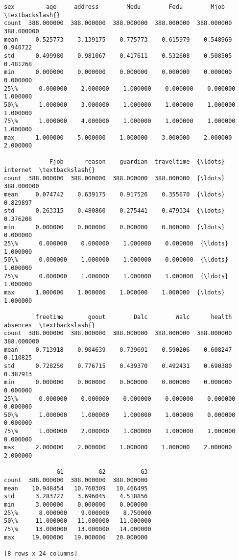             \begin{tcolorbox}[breakable, size=fbox, boxrule=.5pt, pad at break*=1mm, opacityfill=0]
\begin{Verbatim}[commandchars=\\\{\}]
              sex         age     address        Medu        Fedu        Mjob  \textbackslash{}
count  388.000000  388.000000  388.000000  388.000000  388.000000  388.000000
mean     0.525773    3.139175    0.775773    0.615979    0.548969    0.940722
std      0.499980    0.981067    0.417611    0.532608    0.508505    0.481268
min      0.000000    0.000000    0.000000    0.000000    0.000000    0.000000
25\%      0.000000    2.000000    1.000000    0.000000    0.000000    1.000000
50\%      1.000000    3.000000    1.000000    1.000000    1.000000    1.000000
75\%      1.000000    4.000000    1.000000    1.000000    1.000000    1.000000
max      1.000000    5.000000    1.000000    3.000000    2.000000    2.000000

             Fjob      reason    guardian  traveltime  {\ldots}    internet  \textbackslash{}
count  388.000000  388.000000  388.000000  388.000000  {\ldots}  388.000000
mean     0.074742    0.639175    0.917526    0.355670  {\ldots}    0.829897
std      0.263315    0.480860    0.275441    0.479334  {\ldots}    0.376208
min      0.000000    0.000000    0.000000    0.000000  {\ldots}    0.000000
25\%      0.000000    0.000000    1.000000    0.000000  {\ldots}    1.000000
50\%      0.000000    1.000000    1.000000    0.000000  {\ldots}    1.000000
75\%      0.000000    1.000000    1.000000    1.000000  {\ldots}    1.000000
max      1.000000    1.000000    1.000000    1.000000  {\ldots}    1.000000

         freetime       goout        Dalc        Walc      health    absences  \textbackslash{}
count  388.000000  388.000000  388.000000  388.000000  388.000000  388.000000
mean     0.713918    0.904639    0.739691    0.590206    0.608247    0.110825
std      0.728250    0.776715    0.439370    0.492431    0.690380    0.387913
min      0.000000    0.000000    0.000000    0.000000    0.000000    0.000000
25\%      0.000000    0.000000    0.000000    0.000000    0.000000    0.000000
50\%      1.000000    1.000000    1.000000    1.000000    0.000000    0.000000
75\%      1.000000    2.000000    1.000000    1.000000    1.000000    0.000000
max      2.000000    2.000000    1.000000    1.000000    2.000000    2.000000

               G1          G2          G3
count  388.000000  388.000000  388.000000
mean    10.948454   10.760309   10.466495
std      3.283727    3.696045    4.518856
min      3.000000    0.000000    0.000000
25\%      8.000000    9.000000    8.750000
50\%     11.000000   11.000000   11.000000
75\%     13.000000   13.000000   14.000000
max     19.000000   19.000000   20.000000

[8 rows x 24 columns]
\end{Verbatim}
\end{tcolorbox}
        
